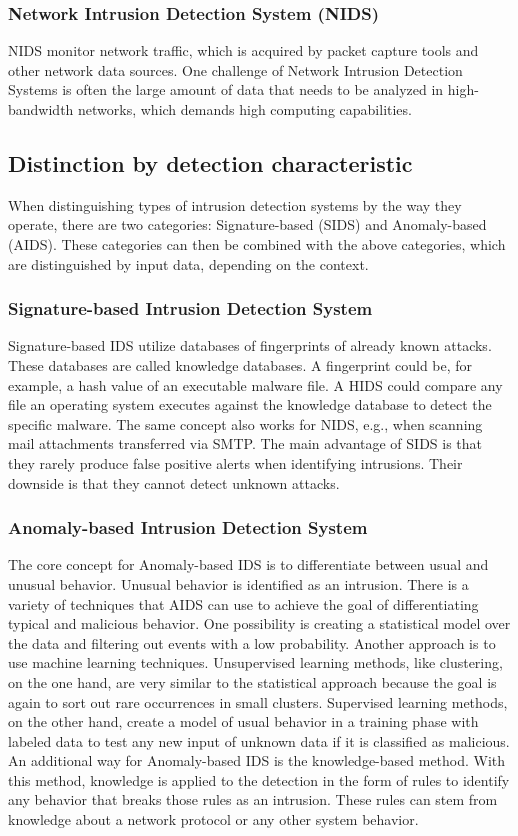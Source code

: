 \subsubsection{Network Intrusion Detection System (NIDS)}
NIDS monitor network traffic, which is acquired by packet capture tools and other network data sources. One challenge of Network Intrusion Detection Systems is often the large amount of data that needs to be analyzed in high-bandwidth networks, which demands high computing capabilities.

\subsection{Distinction by detection characteristic}
When distinguishing types of intrusion detection systems by the way they operate, there are two categories: Signature-based (SIDS) and Anomaly-based (AIDS). These categories can then be combined with the above categories, which are distinguished by input data, depending on the context.

\subsubsection{Signature-based Intrusion Detection System}
Signature-based IDS utilize databases of fingerprints of already known attacks. These databases are called knowledge databases. A fingerprint could be, for example, a hash value of an executable malware file. A HIDS could compare any file an operating system executes against the knowledge database to detect the specific malware. The same concept also works for NIDS, e.g., when scanning mail attachments transferred via SMTP. The main advantage of SIDS is that they rarely produce false positive alerts when identifying intrusions. Their downside is that they cannot detect unknown attacks.

\subsubsection{Anomaly-based Intrusion Detection System}
The core concept for Anomaly-based IDS is to differentiate between usual and unusual behavior. Unusual behavior is identified as an intrusion. There is a variety of techniques that AIDS can use to achieve the goal of differentiating typical and malicious behavior. One possibility is creating a statistical model over the data and filtering out events with a low probability. 
Another approach is to use machine learning techniques. Unsupervised learning methods, like clustering, on the one hand, are very similar to the statistical approach because the goal is again to sort out rare occurrences in small clusters. Supervised learning methods, on the other hand, create a model of usual behavior in a training phase with labeled data to test any new input of unknown data if it is classified as malicious. 
An additional way for Anomaly-based IDS is the knowledge-based method. With this method, knowledge is applied to the detection in the form of rules to identify any behavior that breaks those rules as an intrusion. These rules can stem from knowledge about a network protocol or any other system behavior.

